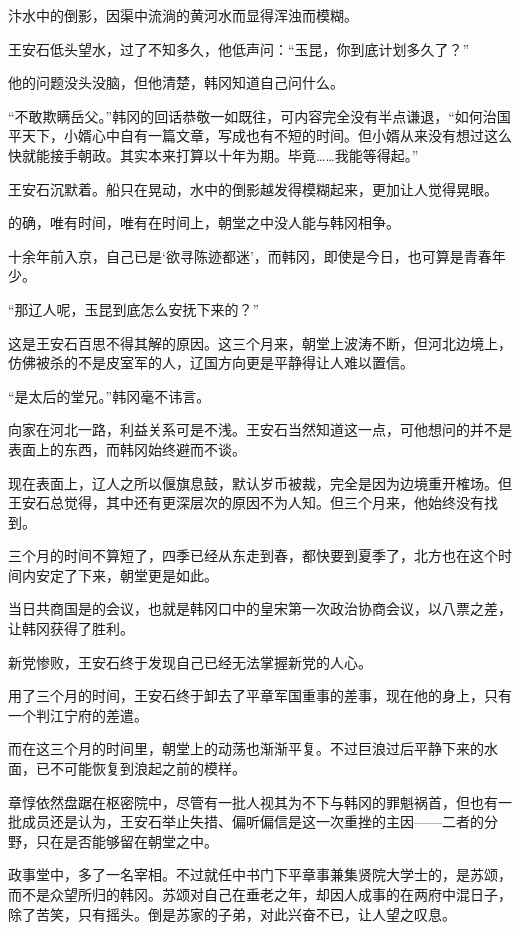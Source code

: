 汴水中的倒影，因渠中流淌的黄河水而显得浑浊而模糊。

王安石低头望水，过了不知多久，他低声问：“玉昆，你到底计划多久了？”

他的问题没头没脑，但他清楚，韩冈知道自己问什么。

“不敢欺瞒岳父。”韩冈的回话恭敬一如既往，可内容完全没有半点谦退，“如何治国平天下，小婿心中自有一篇文章，写成也有不短的时间。但小婿从来没有想过这么快就能接手朝政。其实本来打算以十年为期。毕竟……我能等得起。”

王安石沉默着。船只在晃动，水中的倒影越发得模糊起来，更加让人觉得晃眼。

的确，唯有时间，唯有在时间上，朝堂之中没人能与韩冈相争。

十余年前入京，自己已是‘欲寻陈迹都迷’，而韩冈，即使是今日，也可算是青春年少。

“那辽人呢，玉昆到底怎么安抚下来的？”

这是王安石百思不得其解的原因。这三个月来，朝堂上波涛不断，但河北边境上，仿佛被杀的不是皮室军的人，辽国方向更是平静得让人难以置信。

“是太后的堂兄。”韩冈毫不讳言。

向家在河北一路，利益关系可是不浅。王安石当然知道这一点，可他想问的并不是表面上的东西，而韩冈始终避而不谈。

现在表面上，辽人之所以偃旗息鼓，默认岁币被裁，完全是因为边境重开榷场。但王安石总觉得，其中还有更深层次的原因不为人知。但三个月来，他始终没有找到。

三个月的时间不算短了，四季已经从东走到春，都快要到夏季了，北方也在这个时间内安定了下来，朝堂更是如此。

当日共商国是的会议，也就是韩冈口中的皇宋第一次政治协商会议，以八票之差，让韩冈获得了胜利。

新党惨败，王安石终于发现自己已经无法掌握新党的人心。

用了三个月的时间，王安石终于卸去了平章军国重事的差事，现在他的身上，只有一个判江宁府的差遣。

而在这三个月的时间里，朝堂上的动荡也渐渐平复。不过巨浪过后平静下来的水面，已不可能恢复到浪起之前的模样。

章惇依然盘踞在枢密院中，尽管有一批人视其为不下与韩冈的罪魁祸首，但也有一批成员还是认为，王安石举止失措、偏听偏信是这一次重挫的主因——二者的分野，只在是否能够留在朝堂之中。

政事堂中，多了一名宰相。不过就任中书门下平章事兼集贤院大学士的，是苏颂，而不是众望所归的韩冈。苏颂对自己在垂老之年，却因人成事的在两府中混日子，除了苦笑，只有摇头。倒是苏家的子弟，对此兴奋不已，让人望之叹息。

